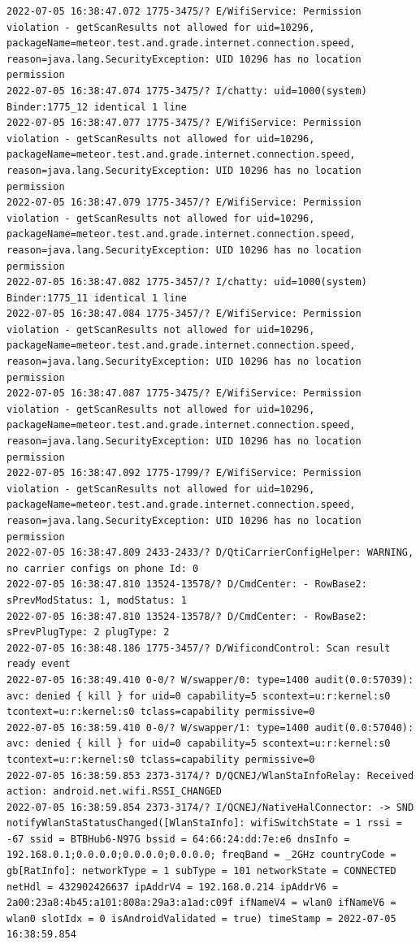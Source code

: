 \documentclass[a4paper,12pt]{book}
\begin{document}
\begin{lstlisting}
2022-07-05 16:38:47.072 1775-3475/? E/WifiService: Permission violation - getScanResults not allowed for uid=10296, packageName=meteor.test.and.grade.internet.connection.speed, reason=java.lang.SecurityException: UID 10296 has no location permission
2022-07-05 16:38:47.074 1775-3475/? I/chatty: uid=1000(system) Binder:1775_12 identical 1 line
2022-07-05 16:38:47.077 1775-3475/? E/WifiService: Permission violation - getScanResults not allowed for uid=10296, packageName=meteor.test.and.grade.internet.connection.speed, reason=java.lang.SecurityException: UID 10296 has no location permission
2022-07-05 16:38:47.079 1775-3457/? E/WifiService: Permission violation - getScanResults not allowed for uid=10296, packageName=meteor.test.and.grade.internet.connection.speed, reason=java.lang.SecurityException: UID 10296 has no location permission
2022-07-05 16:38:47.082 1775-3457/? I/chatty: uid=1000(system) Binder:1775_11 identical 1 line
2022-07-05 16:38:47.084 1775-3457/? E/WifiService: Permission violation - getScanResults not allowed for uid=10296, packageName=meteor.test.and.grade.internet.connection.speed, reason=java.lang.SecurityException: UID 10296 has no location permission
2022-07-05 16:38:47.087 1775-3475/? E/WifiService: Permission violation - getScanResults not allowed for uid=10296, packageName=meteor.test.and.grade.internet.connection.speed, reason=java.lang.SecurityException: UID 10296 has no location permission
2022-07-05 16:38:47.092 1775-1799/? E/WifiService: Permission violation - getScanResults not allowed for uid=10296, packageName=meteor.test.and.grade.internet.connection.speed, reason=java.lang.SecurityException: UID 10296 has no location permission
2022-07-05 16:38:47.809 2433-2433/? D/QtiCarrierConfigHelper: WARNING, no carrier configs on phone Id: 0
2022-07-05 16:38:47.810 13524-13578/? D/CmdCenter: - RowBase2: sPrevModStatus: 1, modStatus: 1
2022-07-05 16:38:47.810 13524-13578/? D/CmdCenter: - RowBase2: sPrevPlugType: 2 plugType: 2
2022-07-05 16:38:48.186 1775-3457/? D/WificondControl: Scan result ready event
2022-07-05 16:38:49.410 0-0/? W/swapper/0: type=1400 audit(0.0:57039): avc: denied { kill } for uid=0 capability=5 scontext=u:r:kernel:s0 tcontext=u:r:kernel:s0 tclass=capability permissive=0
2022-07-05 16:38:59.410 0-0/? W/swapper/1: type=1400 audit(0.0:57040): avc: denied { kill } for uid=0 capability=5 scontext=u:r:kernel:s0 tcontext=u:r:kernel:s0 tclass=capability permissive=0
2022-07-05 16:38:59.853 2373-3174/? D/QCNEJ/WlanStaInfoRelay: Received action: android.net.wifi.RSSI_CHANGED
2022-07-05 16:38:59.854 2373-3174/? I/QCNEJ/NativeHalConnector: -> SND notifyWlanStaStatusChanged([WlanStaInfo]: wifiSwitchState = 1 rssi = -67 ssid = BTBHub6-N97G bssid = 64:66:24:dd:7e:e6 dnsInfo = 192.168.0.1;0.0.0.0;0.0.0.0;0.0.0.0; freqBand = _2GHz countryCode = gb[RatInfo]: networkType = 1 subType = 101 networkState = CONNECTED netHdl = 432902426637 ipAddrV4 = 192.168.0.214 ipAddrV6 = 2a00:23a8:4b45:a101:808a:29a3:a1ad:c09f ifNameV4 = wlan0 ifNameV6 = wlan0 slotIdx = 0 isAndroidValidated = true) timeStamp = 2022-07-05 16:38:59.854

\end{lstlisting}
\end{document}
